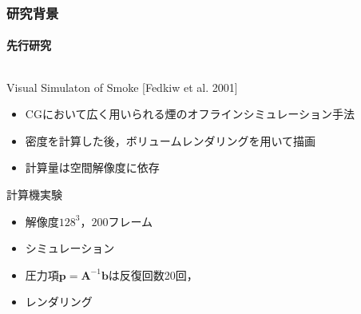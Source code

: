 \documentclass[aspectratio=169,dvipdfmx,hyperref={bookmarks=true}]{beamer}
\begin{document}
\begin{frame}
 \frametitle{研究背景}
   \framesubtitle{先行研究}
\begin{columns}[T]
	\begin{column}{0.6\linewidth}
	\begin{block}{Visual Simulaton of Smoke \cite{fedkiw} [Fedkiw et al. 2001]}
		\begin{itemize}
		\item CGにおいて広く用いられる煙のオフラインシミュレーション手法
		\item 密度を計算した後，ボリュームレンダリングを用いて描画
		\item 計算量は空間解像度に依存
	\end{itemize}
	\end{block}
	
	\begin{block}{計算機実験}
	\begin{itemize}
	\item 解像度$128^3$，$200$フレーム
	\item シミュレーション
	\item 圧力項$\bm{p} = \bm{A}^{-1}\bm{b}$は反復回数20回，
	\item レンダリング
	\end{itemize}
	\end{block}
    	\end{column}
	\begin{column}{0.4\linewidth}
    	\end{column}
    \end{columns}
 \end{frame}
\end{document}
